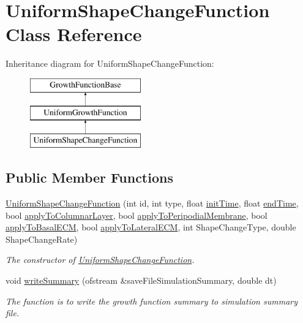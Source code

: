 \hypertarget{classUniformShapeChangeFunction}{}\section{Uniform\+Shape\+Change\+Function Class Reference}
\label{classUniformShapeChangeFunction}
Inheritance diagram for Uniform\+Shape\+Change\+Function\+:\begin{figure}[H]
\begin{center}
\leavevmode
\includegraphics[height=3.000000cm]{classUniformShapeChangeFunction}
\end{center}
\end{figure}
\subsection*{Public Member Functions}
\begin{DoxyCompactItemize}
\item 
\hyperlink{classUniformShapeChangeFunction_afa0eddca7000c9f270e4179f0718fd23}{Uniform\+Shape\+Change\+Function} (int id, int type, float \hyperlink{classGrowthFunctionBase_ae92513a7b41637df8e26e7db35ddf97c}{init\+Time}, float \hyperlink{classGrowthFunctionBase_a3ff4db0573d354a75666a5f3ca446941}{end\+Time}, bool \hyperlink{classGrowthFunctionBase_a3d56771e7c145589a14e11cc331e0326}{apply\+To\+Columnar\+Layer}, bool \hyperlink{classGrowthFunctionBase_a08ae19f58cb98fa8e315a77f52749732}{apply\+To\+Peripodial\+Membrane}, bool \hyperlink{classGrowthFunctionBase_a9fe46fc6dde4041b79204beb48972a09}{apply\+To\+Basal\+E\+C\+M}, bool \hyperlink{classGrowthFunctionBase_ac623b1dbe376bce5dddbe1a2e21c776f}{apply\+To\+Lateral\+E\+C\+M}, int Shape\+Change\+Type, double Shape\+Change\+Rate)
\begin{DoxyCompactList}\small\item\em The constructor of \hyperlink{classUniformShapeChangeFunction}{Uniform\+Shape\+Change\+Function}. \end{DoxyCompactList}\item 
void \hyperlink{classUniformShapeChangeFunction_a196a7555899800406ee62714a20b34c4}{write\+Summary} (ofstream \&save\+File\+Simulation\+Summary, double dt)
\begin{DoxyCompactList}\small\item\em The function is to write the growth function summary to simulation summary file. \end{DoxyCompactList}\end{DoxyCompactItemize}
